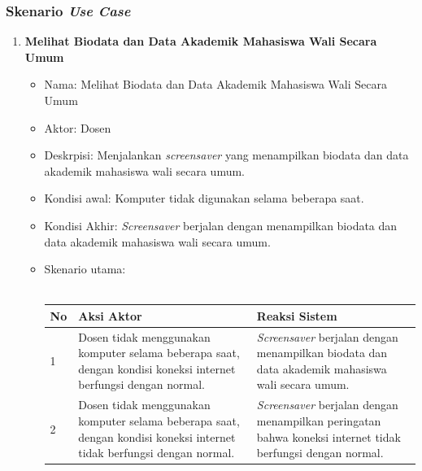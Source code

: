 \subsubsection{Skenario \textit{Use Case}}
\begin{enumerate}
	\item \textbf{Melihat Biodata dan Data Akademik Mahasiswa Wali Secara Umum}
	\begin{itemize}
		\item Nama: Melihat Biodata dan Data Akademik Mahasiswa Wali Secara Umum
		\item Aktor: Dosen 
		\item Deskrpisi: Menjalankan \textit{screensaver} yang menampilkan biodata dan data akademik mahasiswa wali secara umum.
		\item Kondisi awal: Komputer tidak digunakan selama beberapa saat.
		\item Kondisi Akhir: \textit{Screensaver} berjalan dengan menampilkan biodata dan data akademik mahasiswa wali secara umum.
		\item Skenario utama: \\ \\
			\begin{tabular}{|p{0.5cm} |p{6cm}| p{6cm}|}
				\hline
				No 	& Aksi Aktor & Reaksi Sistem \\ \hline
				1 	& Dosen tidak menggunakan komputer selama beberapa saat, dengan kondisi  koneksi internet berfungsi dengan normal.  	&	\textit{Screensaver} berjalan dengan menampilkan biodata dan data akademik mahasiswa wali secara umum. \\ \hline 
				2 	& Dosen tidak menggunakan komputer selama beberapa saat, dengan kondisi koneksi internet tidak berfungsi dengan normal. 	&	\textit{Screensaver} berjalan dengan menampilkan peringatan bahwa koneksi internet tidak berfungsi dengan normal. \\ \hline 
			\end{tabular}
	\end{itemize}


\end{enumerate}
